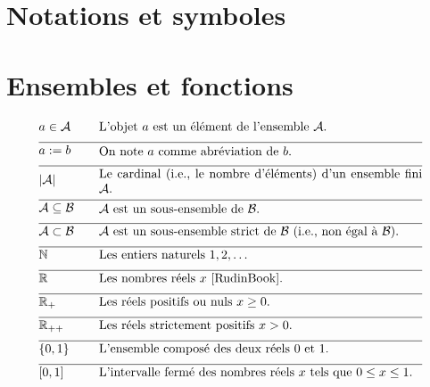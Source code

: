 
\section*{Notations et symboles}

\vspace*{-2mm}
\section*{Ensembles et fonctions} 

\begin{align} 
	&a \in \mathcal{A} & \quad & \parbox{.75\textwidth}{L'objet $a$ est un élément de l'ensemble $\mathcal{A}$.} \nonumber \\[2mm] \hline \nonumber\\[-5mm]
	&a \defeq b & \quad & \parbox{.75\textwidth}{On note $a$ comme abréviation de $b$.} \nonumber \\[2mm] \hline \nonumber\\[-5mm]
	&|\mathcal{A}| & \quad & \parbox{.75\textwidth}{Le cardinal (i.e., le nombre d'éléments) d'un ensemble fini $\mathcal{A}$.} \nonumber \\[2mm] \hline \nonumber\\[-5mm]
	&\mathcal{A} \subseteq \mathcal{B}& \quad & \parbox{.75\textwidth}{$\mathcal{A}$ est un sous-ensemble de $\mathcal{B}$.} \nonumber \\[2mm] \hline \nonumber\\[-5mm]
	&\mathcal{A} \subset \mathcal{B}& \quad & \parbox{.75\textwidth}{$\mathcal{A}$ est un sous-ensemble strict de $\mathcal{B}$ (i.e., non égal à $\mathcal{B}$).} \nonumber \\[2mm] \hline \nonumber\\[-5mm]
	&\mathbb{N} & \quad & \parbox{.75\textwidth}{Les entiers naturels $1,2,\ldots$} \nonumber \\[2mm] \hline \nonumber\\[-5mm]
	&\mathbb{R}  &\quad &\parbox{.75\textwidth}{Les nombres réels $x$ \cite{RudinBook}.} \nonumber \\[2mm] \hline \nonumber\\[-5mm]
	&\mathbb{R}_{+}  &\quad &\parbox{.75\textwidth}{Les réels positifs ou nuls $x\geq0$.} \nonumber \\[2mm] \hline \nonumber\\[-5mm]
	&\mathbb{R}_{++}  &\quad &\parbox{.75\textwidth}{Les réels strictement positifs $x> 0$.} \nonumber \\[2mm] \hline \nonumber\\[-5mm]
	&\{0,1\}& \quad & \parbox{.75\textwidth}{L'ensemble composé des deux réels $0$ et $1$.} \nonumber \\[2mm] \hline \nonumber\\[-5mm]
	&[0,1] &\quad &\parbox{.75\textwidth}{L'intervalle fermé des nombres réels $x$ tels que $0 \leq x \leq 1$.} \nonumber
\end{align} 


